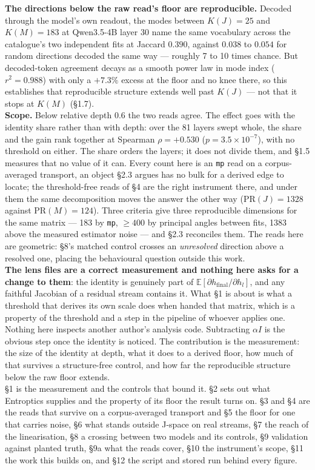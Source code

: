 \documentclass[10pt,letterpaper,twocolumn]{article}
\begin{document}
{\textbf{The directions below the raw read's floor are reproducible.} Decoded through the model's own
readout, the modes between \(K(J)=25\) and \(K(M)=183\) at Qwen3.5-4B layer 30 name the same vocabulary
across the catalogue's two independent fits at Jaccard \(0.390\), against \(0.038\) to \(0.054\) for
random directions decoded the same way --- roughly 7 to 10 times chance. But decoded-token agreement decays as a smooth power law in mode
index (\(r^2=0.988\)) with only a \(+7.3\%\) excess at the floor and no knee there, so this establishes
that reproducible structure extends well past \(K(J)\) --- not that it stops at \(K(M)\) (§1.7).\\
\textbf{Scope.} Below relative depth 0.6 the two reads agree. The effect goes with the identity share
rather than with depth: over the 81 layers swept whole, the share and the gain rank together at
Spearman \(\rho=+0.530\) (\(p=3.5\times10^{-7}\)), with no threshold on either. The share orders the
layers; it does not divide them, and §1.5 measures that no value of it can. Every count here is an \texttt{mp} read on a corpus-averaged
transport, an object §2.3 argues has no bulk for a derived edge to locate; the threshold-free reads
of §4 are the right instrument there, and under them the same decomposition moves the answer the
other way (\(\mathrm{PR}(J)=1328\) against \(\mathrm{PR}(M)=124\)). Three criteria give three
reproducible dimensions for the same matrix --- 183 by \texttt{mp}, \(\ge 400\) by principal angles between
fits, 1383 above the measured estimator noise --- and §2.3 reconciles them. The reads here are geometric: §8's matched control crosses an \emph{unresolved} direction above a
resolved one, placing the behavioural question outside this work.\\
\textbf{The lens files are a correct measurement and nothing here asks for a change to them}: the
identity is genuinely part of \(\mathbb{E}[\partial h_{\text{final}}/\partial h_l]\), and any
faithful Jacobian of a residual stream contains it. What §1 is about is what a threshold that
derives its own scale does when handed that matrix, which is a property of the threshold and a
step in the pipeline of whoever applies one. Nothing here inspects another author's analysis code.
Subtracting \(\alpha I\) is the obvious step once the identity is noticed. The contribution is the
measurement: the size of the
identity at depth, what it does to a derived floor, how much of that survives a structure-free
control, and how far the reproducible structure below the raw floor extends.\\
§1 is the measurement and the controls that bound it. §2 sets out what Entroptics supplies and the
property of its floor the result turns on. §3 and §4 are the reads that survive on a
corpus-averaged transport and §5 the floor for one that carries noise, §6 what stands outside
J-space on real streams, §7 the reach of the linearisation, §8 a crossing between two models and
its controls, §9 validation against planted truth, §9a what the reads cover, §10 the
instrument's scope, §11 the work this builds on, and §12 the script and stored run behind
every figure.
}
\end{document}
